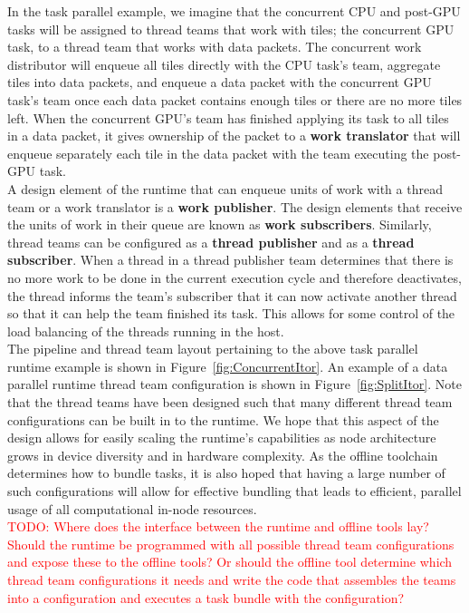 \documentclass{article}
\begin{document}
In the task parallel example, we imagine that the concurrent CPU and post-GPU
tasks will be assigned to thread teams that work with tiles; the concurrent GPU
task, to a thread team that works with data packets.  The concurrent work
distributor will enqueue all tiles directly with the CPU task's team, aggregate
tiles into data packets, and enqueue a data packet with the concurrent GPU
task's team once each data packet contains enough tiles or there are no more
tiles left.  When the concurrent GPU's team has finished applying its task to
all tiles in a data packet, it gives ownership of the packet to a \textbf{work
translator} that will enqueue separately each tile in the data packet with the
team executing the post-GPU task.\\

A design element of the runtime that can enqueue units of work with a thread
team or a work translator is a \textbf{work publisher}.  The design elements
that receive the units of work in their queue are known as \textbf{work
subscribers}.  Similarly, thread teams can be configured as a \textbf{thread
publisher} and as a \textbf{thread subscriber}.  When a thread in a thread
publisher team determines that there is no more work to be done in the current
execution cycle and therefore deactivates, the thread informs the team's
subscriber that it can now activate another thread so that it can help the team
finished its task.  This allows for some control of the load balancing of the
threads running in the host.\\

The pipeline and thread team layout pertaining to the above task parallel
runtime example is shown in Figure~\ref{fig:ConcurrentItor}.  An example of a data parallel
runtime thread team configuration is shown in Figure~\ref{fig:SplitItor}.  Note that the
thread teams have been designed such that many different thread team
configurations can be built in to the runtime.  We hope that this aspect of the
design allows for easily scaling the runtime's capabilities as node architecture
grows in device diversity and in hardware complexity.  As the offline toolchain
determines how to bundle tasks, it is also hoped that having a large number of
such configurations will allow for effective bundling that leads to efficient,
parallel usage of all computational in-node resources.\\

\textcolor{red}{TODO: Where does the interface between the runtime and offline
tools lay?  Should the runtime be programmed with all possible thread team
configurations and expose these to the offline tools?  Or should the offline
tool determine which thread team configurations it needs and write the code
that assembles the teams into a configuration and executes a task bundle with
the configuration?}\\
\end{document}
